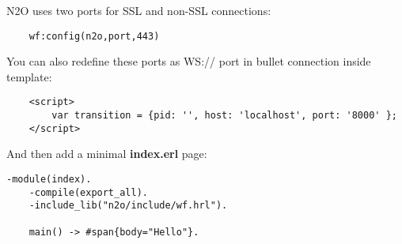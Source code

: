 N2O uses two ports for SSL and non-SSL connections:

\vspace{1\baselineskip}
\begin{lstlisting}
    wf:config(n2o,port,443)
\end{lstlisting}
\vspace{1\baselineskip}

You can also redefine these ports as WS:// port in bullet connection inside template:

\vspace{1\baselineskip}
\begin{lstlisting}
    <script>
        var transition = {pid: '', host: 'localhost', port: '8000' };
    </script>
\end{lstlisting}
\vspace{1\baselineskip}

And then add a minimal {\bf index.erl} page:

\begin{lstlisting}[caption=index.erl]
    -module(index).
    -compile(export_all).
    -include_lib("n2o/include/wf.hrl").

    main() -> #span{body="Hello"}.
\end{lstlisting}
